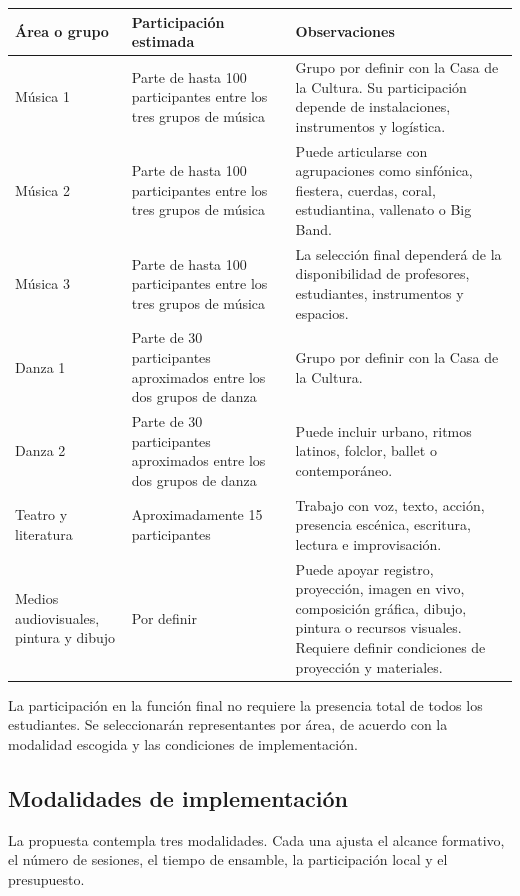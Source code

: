 \documentclass[11pt,a4paper]{article}
\newcommand{\SectionTone}{SectionBlue}
\newcommand{\tableheadcolor}{\rowcolor{\SectionTone!22}}
\begin{document}
{\small
\begin{longtable}{@{}L{0.25\textwidth}L{0.28\textwidth}L{0.41\textwidth}@{}}
\toprule
\tableheadcolor
\textbf{Área o grupo} & \textbf{Participación estimada} & \textbf{Observaciones} \\
\midrule
\endhead
\bottomrule
\endlastfoot
Música 1 & Parte de hasta 100 participantes entre los tres grupos de música & Grupo por definir con la Casa de la Cultura. Su participación depende de instalaciones, instrumentos y logística. \\
Música 2 & Parte de hasta 100 participantes entre los tres grupos de música & Puede articularse con agrupaciones como sinfónica, fiestera, cuerdas, coral, estudiantina, vallenato o Big Band. \\
Música 3 & Parte de hasta 100 participantes entre los tres grupos de música & La selección final dependerá de la disponibilidad de profesores, estudiantes, instrumentos y espacios. \\
Danza 1 & Parte de 30 participantes aproximados entre los dos grupos de danza & Grupo por definir con la Casa de la Cultura. \\
Danza 2 & Parte de 30 participantes aproximados entre los dos grupos de danza & Puede incluir urbano, ritmos latinos, folclor, ballet o contemporáneo. \\
Teatro y literatura & Aproximadamente 15 participantes & Trabajo con voz, texto, acción, presencia escénica, escritura, lectura e improvisación. \\
Medios audiovisuales, pintura y dibujo & Por definir & Puede apoyar registro, proyección, imagen en vivo, composición gráfica, dibujo, pintura o recursos visuales. Requiere definir condiciones de proyección y materiales. \\
\end{longtable}
}

La participación en la función final no requiere la presencia total de todos los estudiantes. Se seleccionarán representantes por área, de acuerdo con la modalidad escogida y las condiciones de implementación.

\subsection{Modalidades de implementación}

La propuesta contempla tres modalidades. Cada una ajusta el alcance formativo, el número de sesiones, el tiempo de ensamble, la participación local y el presupuesto.
\end{document}
